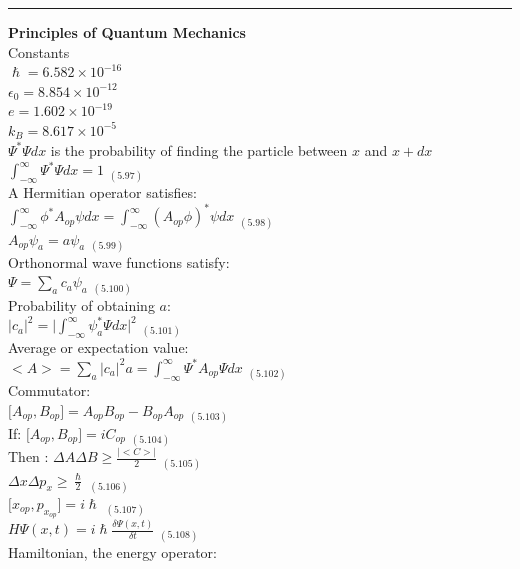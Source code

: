 \documentclass[0pt]{report}
\begin{document}
\begin{multicols*}{3}
\begin{flushleft}
\setlength{\abovedisplayskip}{1pt}
\setlength{\belowdisplayskip}{1pt}
\setlength{\abovedisplayshortskip}{1pt}
\setlength{\belowdisplayshortskip}{1pt}

\noindent\rule[0.5ex]{\linewidth}{1pt}
\textbf{Principles of Quantum Mechanics}\\
Constants\\
$\hslash=6.582\times10^{-16}$\\
$\epsilon_0=8.854\times10^{-12}$\\
$e=1.602\times10^{-19}$\\
$k_B=8.617\times10^{-5}$\\

$\Psi^*\Psi dx$ is the probability of finding the particle between $x$ and $x+dx$\\
$\int_{-\infty}^{\infty}\Psi^*\Psi dx=1$ $_{(5.97)}$\\
A Hermitian operator satisfies:\\
$\int_{-\infty}^{\infty}\phi^*A_{op}\psi dx=\int_{-\infty}^{\infty}(A_{op}\phi)^*\psi dx$ $_{(5.98)}$\\
$A_{op}\psi_a=a\psi_a$ $_{(5.99)}$\\
Orthonormal wave functions satisfy:\\
$\Psi=\sum_{a} c_a\psi_a$ $_{(5.100)}$\\
Probability of obtaining $a$:\\
$|c_a|^2=\Big|\int_{-\infty}^{\infty}\psi_a^*\Psi dx\Big|^2$ $_{(5.101)}$\\
Average or expectation value:\\
$\big<A\big>=\sum_a|c_a|^2a=\int_{-\infty}^{\infty}\Psi^*A_{op}\Psi dx$ $_{(5.102)}$\\
Commutator:\\
$\big[A_{op},B_{op}\big]=A_{op}B_{op}-B_{op}A_{op}$ $_{(5.103)}$\\
If: $\big[A_{op},B_{op}\big]=iC_{op}$ $_{(5.104)}$\\
Then : $\Delta A\Delta B\geq\frac{\big|\big<C\big>\big|}{2}$ $_{(5.105)}$\\
$\Delta x\Delta p_x\geq\frac{\hslash}{2}$ $_{(5.106)}$\\
$\big[x_{op},p_{x_{op}}\big]=i\hslash$ $_{(5.107)}$\\
$H\Psi(x,t)=i\hslash\frac{\delta\Psi(x,t)}{\delta t}$ $_{(5.108)}$\\
Hamiltonian, the energy operator:\\

\end{flushleft}
\end{multicols*}
\end{document}
